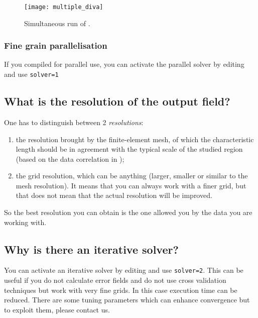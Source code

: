\begin{figure}[htpb]
\centering
\texttt{[image: multiple\_diva]}
\caption{Simultaneous run of \diva.}
\end{figure}

\subsubsection{Fine grain parallelisation}

If you compiled \diva for parallel use, you can activate the parallel solver by editing  and use \texttt{solver=1}

\subsection{What is the resolution of the output field?}

One has to distinguish between 2 \textit{resolutions}:

\begin{enumerate}
\item the resolution brought by the finite-element mesh, of which the characteristic length should be in agreement with the typical scale of the studied region (based on the data correlation in \diva);

\item the grid resolution, which can be anything (larger, smaller or similar to the mesh resolution). It means that you can always work with a finer grid, but that does not mean that the actual resolution will be improved.
\end{enumerate}

So the best resolution you can obtain is the one allowed you by the data you are working with.


\subsection{Why is there an iterative solver?}

You can activate an iterative solver by editing  and use \texttt{solver=2}. This can be useful if you do not calculate error fields and do not use cross validation techniques but work with very fine grids. In this case execution time can be reduced. There are some tuning parameters which can enhance convergence but to exploit them, please contact us.



